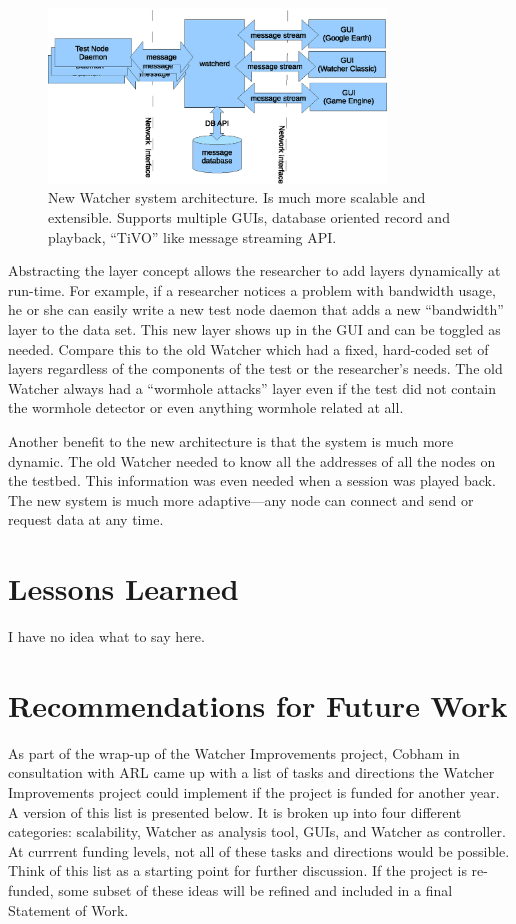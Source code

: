\documentclass{report}
\begin{document}
\begin{figure}[htb]
\centering
\includegraphics[width=0.8\textwidth]{watcherArch.eps}
\caption{New Watcher system architecture. Is much more scalable and extensible. Supports multiple GUIs, database oriented record and playback, ``TiVO'' like message streaming API.} 
\label{fig:watcherArch}
\end{figure}

Abstracting the layer concept allows the researcher to add layers dynamically at run-time. For example, 
if a researcher notices a problem with bandwidth usage, he or she can easily write a new test node daemon that 
adds a new ``bandwidth'' layer to the data set. This new layer shows up in the GUI and can be toggled as needed. 
Compare this to the old Watcher which had a fixed, hard-coded set of layers regardless of the components of the test
or the researcher's needs. The old Watcher always had a ``wormhole attacks'' layer even if the test did not 
contain the wormhole detector or even anything wormhole related at all. 

Another benefit to the new architecture is that the system is much more dynamic. The old Watcher needed to know all the addresses of all the nodes
on the testbed. This information was even needed when a session was played back. The new system is much more adaptive---any node can connect and 
send or request data at any time. 

\section{Lessons Learned}
I have no idea what to say here. 

\section{Recommendations for Future Work}
As part of the wrap-up of the Watcher Improvements project, Cobham in consultation with ARL came up with a list of tasks and directions
the Watcher Improvements project could implement if the project is funded for another year. A version of this list is presented below. It is 
broken up into four different categories: scalability, Watcher as analysis tool, GUIs, and Watcher as controller. 
At currrent funding levels, not all of these tasks and directions would be possible. Think of this list as a starting point for further
discussion. If the project is re-funded, some subset of these ideas will be refined and included in a final Statement of Work. 
\end{document}
